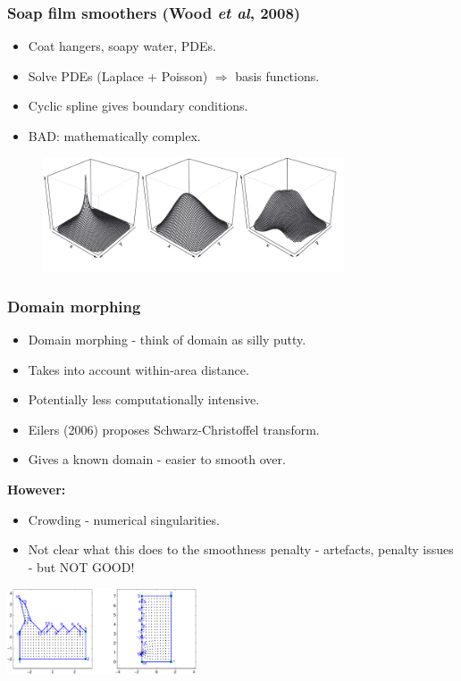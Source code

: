 \documentclass[ignorenonframetext]{beamer} %
\newcommand{\bc}{\begin{center}}
\newcommand{\ec}{\end{center}}
\newcommand{\bi}{\begin{itemize}}
\newcommand{\ei}{\end{itemize}}
\begin{document}
\begin{frame}
	\frametitle{Soap film smoothers (Wood \emph{et al}, 2008)}
	\bi
	   \item Coat hangers, soapy water, PDEs.
	   \item Solve PDEs (Laplace + Poisson) $\Rightarrow$ basis functions.
	   \item Cyclic spline gives boundary conditions.
	   \item BAD: mathematically complex.
	\ei
        \begin{figure}
         	\centering
	\includegraphics[width=3.5in]{figs/soapbases.png}
	\end{figure}
\end{frame}






\begin{frame}
	\frametitle{Domain morphing}
      \bi
         \item Domain morphing - think of domain as silly putty.
         \item Takes into account within-area distance.
         \item Potentially less computationally intensive. 
         \item Eilers (2006) proposes Schwarz-Christoffel transform.
         \item Gives a known domain - easier to smooth over.
      \ei
      \bc
         \textbf{However:}
      \ec
      \bi
         \item Crowding - numerical singularities.
         \item Not clear what this does to the smoothness penalty - artefacts, penalty issues - but NOT GOOD!
      \ei
      \bc
         \includegraphics[height=1in]{figs/matlab-test-3}
      \ec
\end{frame}
\end{document}
